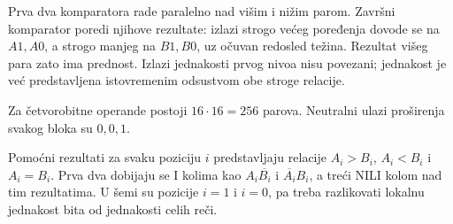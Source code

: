 Prva dva komparatora rade paralelno nad višim i nižim parom. Završni komparator poredi njihove rezultate: izlazi strogo većeg poređenja dovode se na $A1,A0$, a strogo manjeg na $B1,B0$, uz očuvan redosled težina. Rezultat višeg para zato ima prednost. Izlazi jednakosti prvog nivoa nisu povezani; jednakost je već predstavljena istovremenim odsustvom obe stroge relacije.

Za četvorobitne operande postoji $16\cdot16=256$ parova. Neutralni ulazi proširenja svakog bloka su $0,0,1$.

Pomoćni rezultati za svaku poziciju $i$ predstavljaju relacije $A_i>B_i$, $A_i<B_i$ i $A_i=B_i$. Prva dva dobijaju se I kolima kao $A_i\overline{B_i}$ i $\overline{A_i}B_i$, a treći NILI kolom nad tim rezultatima. U šemi su pozicije $i=1$ i $i=0$, pa treba razlikovati lokalnu jednakost bita od jednakosti celih reči.
